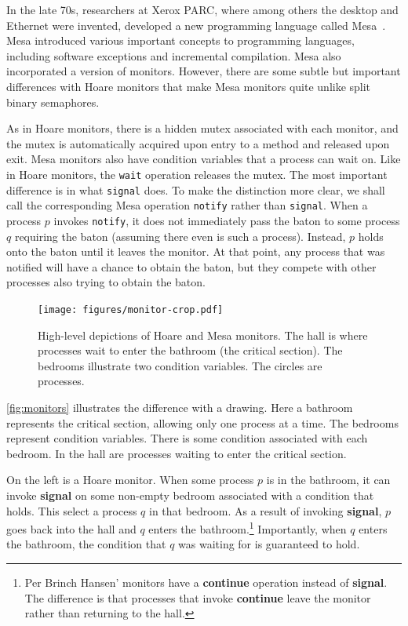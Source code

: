 \documentclass{report}
\begin{document}
In the late 70s, researchers at Xerox PARC,
where among others the desktop and Ethernet
were invented, developed a new programming language called
Mesa~\cite{LR80}.
%
Mesa introduced various important concepts to programming languages,
including software exceptions and incremental compilation.  Mesa also
incorporated a version of monitors.
However, there are some subtle but important differences with Hoare
monitors that make Mesa monitors quite unlike split binary semaphores.

As in Hoare monitors, there is a hidden mutex associated with each monitor,
and the mutex is automatically acquired upon entry to a method and released
upon exit.
Mesa monitors also have condition variables that a process can wait on.
Like in Hoare monitors, the \texttt{wait} operation releases the mutex.
The most important difference is in what \texttt{signal} does.
To make the distinction more clear, we shall call the corresponding Mesa
operation \texttt{notify} rather than \texttt{signal}.
%
When a process $p$ invokes \texttt{notify}, it does not immediately pass 
the baton to some process $q$ requiring the baton (assuming there even
is such a process).  Instead, $p$ holds onto
the baton until it leaves the monitor.  At that point, any process that
was notified will have a chance to obtain the baton, but they compete
with other processes also trying to obtain the baton.

\begin{figure}
\begin{center}
\texttt{[image: figures/monitor-crop.pdf]}
\end{center}
\caption{High-level depictions of Hoare and Mesa monitors.  The hall is
where processes wait to enter the bathroom (the critical section).  The
bedrooms illustrate two condition variables.  The circles are processes.}
\label{fig:monitors}
\end{figure}

\autoref{fig:monitors} illustrates the difference with a drawing.
Here a bathroom represents the critical section, allowing only one
process at a time.  The bedrooms represent condition variables.
There is some condition associated with each bedroom.
In the hall are processes waiting to enter the critical section.

On the left is a Hoare monitor.
When some process $p$ is in the bathroom, it can invoke \textbf{signal}
on some non-empty bedroom associated with a condition that holds.
This select a process $q$ in that bedroom.
As a result of invoking \textbf{signal}, $p$ goes back into the hall
and $q$ enters the bathroom.\footnote{Per Brinch Hansen' monitors have
a \textbf{continue} operation instead of \textbf{signal}.  The difference
is that processes that invoke \textbf{continue} leave the monitor rather
than returning to the hall.}
Importantly, when $q$ enters the bathroom, the condition that $q$ was
waiting for is guaranteed to hold.
\end{document}
